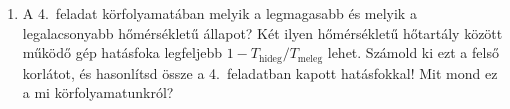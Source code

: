 \documentclass[12pt]{article}
\begin{document}
\vspace{8pt}
\begin{enumerate}[start=5]
\item A 4.~feladat körfolyamatában melyik a legmagasabb és melyik a legalacsonyabb
  hőmérsékletű állapot? Két ilyen hőmérsékletű hőtartály között működő gép hatásfoka
  legfeljebb $1 - T_\text{hideg}/T_\text{meleg}$ lehet. Számold ki ezt a felső korlátot,
  és hasonlítsd össze a 4.~feladatban kapott hatásfokkal! Mit mond ez a mi
  körfolyamatunkról?
\end{enumerate}
\end{document}
